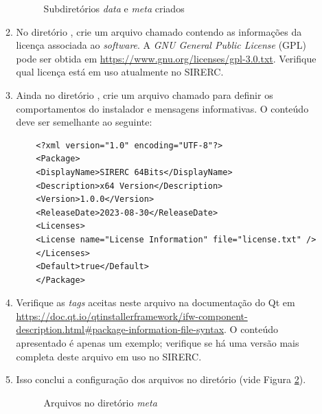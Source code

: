 \documentclass[a4paper,11pt]{article}
\newcommand{\sistema}{\textsf{SIRERC}}
\newcommand{\gnu}{\textit{GNU General Public License}}
\begin{document}
\begin{enumerate}
\begin{enumerate}
		\begin{figure}[H]\centering
			\caption{Subdiretórios \emph{data} e \emph{meta} criados}\label{fig:sirercpackagedirs}
		\end{figure}
		
		\item No diretório , crie um arquivo chamado  contendo as informações da licença associada ao \emph{software}. A \emph{\gnu{}} (GPL) pode ser obtida em \url{https://www.gnu.org/licenses/gpl-3.0.txt}. Verifique qual licença está em uso atualmente no \sistema{}.
		
		\item Ainda no diretório , crie um arquivo chamado  para definir os comportamentos do instalador e mensagens informativas. O conteúdo deve ser semelhante ao seguinte:
		
\begin{lstlisting}
	<?xml version="1.0" encoding="UTF-8"?>
	<Package>
	<DisplayName>SIRERC 64Bits</DisplayName>
	<Description>x64 Version</Description>
	<Version>1.0.0</Version>
	<ReleaseDate>2023-08-30</ReleaseDate>
	<Licenses>
	<License name="License Information" file="license.txt" />
	</Licenses>
	<Default>true</Default>
	</Package>
\end{lstlisting}

		
		\item Verifique as \emph{tags} aceitas neste arquivo na documentação do Qt em \url{https://doc.qt.io/qtinstallerframework/ifw-component-description.html#package-information-file-syntax}. O conteúdo apresentado é apenas um exemplo; verifique se há uma versão mais completa deste arquivo em uso no \sistema{}.
		
		\item Isso conclui a configuração dos arquivos no diretório  (vide Figura \ref{fig:sirercpackagemeta}).
		
		\begin{figure}[H]\centering
			\caption{Arquivos no diretório \emph{meta}}\label{fig:sirercpackagemeta}
		\end{figure}
	\end{enumerate}
	

\end{enumerate}
\end{document}
